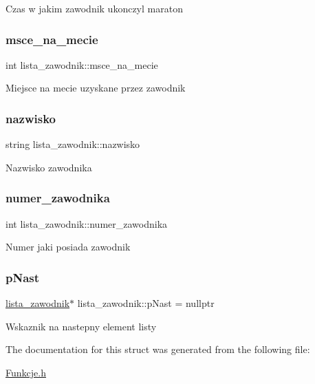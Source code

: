 Czas w jakim zawodnik ukonczyl maraton \mbox{\label{structlista__zawodnik_aee7ce2c8a9ec1e0ff1b426b2ae5e78ac}} 
\subsubsection{\texorpdfstring{msce\_na\_mecie}{msce\_na\_mecie}}
{\footnotesize\ttfamily int lista\+\_\+zawodnik\+::msce\+\_\+na\+\_\+mecie}

Miejsce na mecie uzyskane przez zawodnik \mbox{\label{structlista__zawodnik_a031e84480ad8143556ba80358552689c}} 
\subsubsection{\texorpdfstring{nazwisko}{nazwisko}}
{\footnotesize\ttfamily string lista\+\_\+zawodnik\+::nazwisko}

Nazwisko zawodnika \mbox{\label{structlista__zawodnik_a1c0ad4d316e72c1905a27428eab8def2}} 
\subsubsection{\texorpdfstring{numer\_zawodnika}{numer\_zawodnika}}
{\footnotesize\ttfamily int lista\+\_\+zawodnik\+::numer\+\_\+zawodnika}

Numer jaki posiada zawodnik \mbox{\label{structlista__zawodnik_a4d7a9047ca829ed98e4736beff5af874}} 
\subsubsection{\texorpdfstring{pNast}{pNast}}
{\footnotesize\ttfamily \mbox{\hyperlink{structlista__zawodnik}{lista\+\_\+zawodnik}}$\ast$ lista\+\_\+zawodnik\+::p\+Nast = nullptr}

Wskaznik na nastepny element listy 

The documentation for this struct was generated from the following file\+:\begin{DoxyCompactItemize}
\item 
\mbox{\hyperlink{_funkcje_8h}{Funkcje.\+h}}\end{DoxyCompactItemize}
